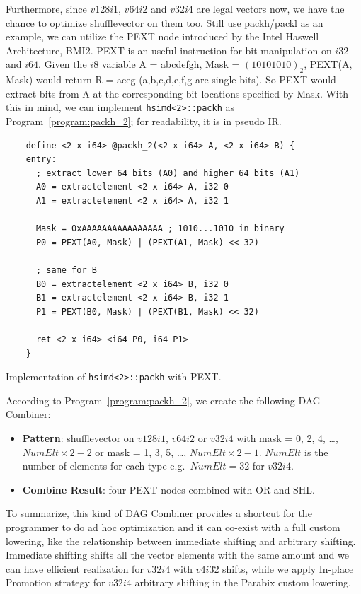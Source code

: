 Furthermore, since $v128i1$, $v64i2$ and $v32i4$ are legal vectors now, we have the chance to optimize shufflevector on them too. Still use packh/packl as an example, we can utilize the PEXT node introduced by the Intel Haswell Architecture, BMI2. PEXT is an useful instruction for bit manipulation on $i32$ and $i64$. Given the $i8$ variable A = abcdefgh, Mask = $(10101010)_2$, PEXT(A, Mask) would return R = aceg (a,b,c,d,e,f,g are single bits). So PEXT would extract bits from A at the corresponding bit locations specified by Mask. With this in mind, we can implement \verb|hsimd<2>::packh| as Program~\ref{program:packh_2}; for readability, it is in pseudo IR.

\begin{program}
\begin{verbatim}
    define <2 x i64> @packh_2(<2 x i64> A, <2 x i64> B) {
    entry:
      ; extract lower 64 bits (A0) and higher 64 bits (A1)
      A0 = extractelement <2 x i64> A, i32 0
      A1 = extractelement <2 x i64> A, i32 1

      Mask = 0xAAAAAAAAAAAAAAAA ; 1010...1010 in binary
      P0 = PEXT(A0, Mask) | (PEXT(A1, Mask) << 32)

      ; same for B
      B0 = extractelement <2 x i64> B, i32 0
      B1 = extractelement <2 x i64> B, i32 1
      P1 = PEXT(B0, Mask) | (PEXT(B1, Mask) << 32)

      ret <2 x i64> <i64 P0, i64 P1>
    }
\end{verbatim}
\caption{Implementation of {\tt hsimd<2>::packh} with PEXT.}
\label{program:packh_2}
\end{program}

According to Program~\ref{program:packh_2}, we create the following DAG Combiner:
\begin{itemize}
    \item \textbf{Pattern}: shufflevector on $v128i1$, $v64i2$ or $v32i4$ with mask = 0, 2, 4, \ldots, $NumElt \times 2-2$ or mask = 1, 3, 5, \ldots, $NumElt \times 2 -1$. $NumElt$ is the number of elements for each type e.g.\ $NumElt=32$ for $v32i4$.
    \item \textbf{Combine Result}: four PEXT nodes combined with OR and SHL.
\end{itemize}

To summarize, this kind of DAG Combiner provides a shortcut for the programmer to do ad hoc optimization and it can co-exist with a full custom lowering, like the relationship between immediate shifting and arbitrary shifting. Immediate shifting shifts all the vector elements with the same amount and we can have efficient realization for $v32i4$ with $v4i32$ shifts, while we apply In-place Promotion strategy for $v32i4$ arbitrary shifting in the Parabix custom lowering.

